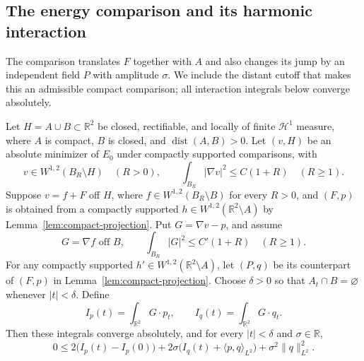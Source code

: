 \subsection{The energy comparison and its harmonic interaction}

The comparison translates $F$ together with $A$ and also changes its jump
by an independent field $P$ with amplitude $\sigma$. We include the distant
cutoff that makes this an admissible compact comparison; all interaction
integrals below converge absolutely.

\begin{lemma}
\label{lem:translated-comparison}
Let $H=A\cup B\subset\mathbb R^2$ be closed, rectifiable, and locally of finite
$\mathcal H^1$ measure, where $A$ is compact, $B$ is closed, and
$\operatorname{dist}(A,B)>0$. Let $(v,H)$ be an absolute minimizer of
$E_0$ under compactly supported comparisons, with
\[
 v\in W^{1,2}(B_R\setminus H)\quad(R>0),\qquad
 \int_{B_R}|\nabla v|^2\leq C(1+R)\quad(R\geq1).
\]
Suppose $v=f+F$ off $H$, where
$f\in W^{1,2}(B_R\setminus B)$ for every $R>0$, and
$(F,p)$ is obtained from a compactly supported
$h\in W^{1,2}(\mathbb R^2\setminus A)$ by
Lemma~\ref{lem:compact-projection}. Put $G=\nabla v-p$, and assume
\[
 G=\nabla f\text{ off }B,\qquad
 \int_{B_R}|G|^2\leq C'(1+R)\quad(R\geq1).
\]
For any compactly supported
$h'\in W^{1,2}(\mathbb R^2\setminus A)$, let $(P,q)$ be its counterpart
of $(F,p)$ in Lemma~\ref{lem:compact-projection}. Choose $\delta>0$ so
that $A_t\cap B=\varnothing$ whenever $|t|<\delta$. Define
\[
 I_p(t)=\int_{\mathbb R^2}G\cdot p_t,
 \qquad I_q(t)=\int_{\mathbb R^2}G\cdot q_t.
\]
Then these integrals converge absolutely, and for every $|t|<\delta$
and $\sigma\in\mathbb R$,
\begin{equation}
 0\leq 2\bigl(I_p(t)-I_p(0)\bigr)
     +2\sigma\bigl(I_q(t)+\langle p,q\rangle_{L^2}\bigr)
     +\sigma^2\|q\|_{L^2}^2.
 \label{eq:translated-energy}
\end{equation}
\end{lemma}


